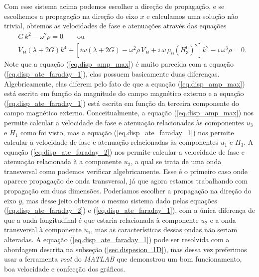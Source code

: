 Com esse sistema acima podemos escolher a dire\c{c}\~ao de propaga\c{c}\~ao, e se escolhemos a propaga\c{c}\~ao na dire\c{c}\~ao do eixo $x$ e calculamos uma solu\c{c}\~ao n\~ao trivial, obtemos as velocidades de fase e atenua\c{c}\~oes atrav\'es das equa\c{c}\~oes
\begin{align}\label{eq.disp_ate_faraday_2}
&G\,k^2-\omega^2\rho=0\qquad\text{ou}\\\label{eq.disp_ate_faraday_1}
&V_H(\lambda+2G)k^4+\left[i\omega(\lambda+2G)-\omega^2\rho\,V_H+i\,\omega\,\mu_0(H_3^0)^2\right]k^2-i\,\omega^3\rho=0.
\end{align}
Note que a equa\c{c}\~ao (\ref{eq.disp_amp_max}) \'e muito parecida com a equa\c{c}\~ao (\ref{eq.disp_ate_faraday_1}), elas possuem basicamente duas diferen\c{c}as. Algebricamente, elas diferem pelo fato de que a equa\c{c}\~ao (\ref{eq.disp_amp_max}) est\'a escrita em fun\c{c}\~ao da magnitude do campo magn\'etico externo e a equa\c{c}\~ao (\ref{eq.disp_ate_faraday_1}) est\'a escrita em fun\c{c}\~ao da terceira componente do campo magn\'etico externo. Conceitualmente, a equa\c{c}\~ao (\ref{eq.disp_amp_max}) nos permite calcular a velocidade de fase e atenua\c{c}\~ao relacionadas \`as componentes $u_{3}$ e $H_{1}$ como foi visto, mas a equa\c{c}\~ao (\ref{eq.disp_ate_faraday_1}) nos permite calcular a velocidade de fase e atenua\c{c}\~ao relacionadas \`as componentes $u_{1}$ e $H_{3}$. A equa\c{c}\~ao (\ref{eq.disp_ate_faraday_2}) nos permite calcular a velocidade de fase e atenua\c{c}\~ao relacionada \`a a componente $u_{2}$, a qual se trata de uma onda transversal como podemos verificar algebricamente. Esse \'e o primeiro caso onde aparece propaga\c{c}\~ao de onda transversal, j\'a que agora estamos trabalhando com propaga\c{c}\~ao em duas dimens\~oes. Poder\'iamos escolher a propaga\c{c}\~ao na dire\c{c}\~ao do eixo $y$, mas desse jeito obtemos o mesmo sistema dado pelas equa\c{c}\~oes (\ref{eq.disp_ate_faraday_2}) e (\ref{eq.disp_ate_faraday_1}), com a \'unica diferen\c{c}a de que a onda longitudinal \'e que estaria relacionada \`a componente $u_{2}$ e a onda transversal \`a componente $u_{1}$, mas as caracter\'isticas dessas ondas n\~ao seriam alteradas. A equa\c{c}\~ao (\ref{eq.disp_ate_faraday_1}) pode ser resolvida com a abordagem descrita na subse\c{c}\~ao (\ref{sec.dispesion_1D}), mas dessa vez preferimos usar a ferramenta \textit{root} do \textit{MATLAB} que demonstrou um bom funcionamento, boa velocidade e confec\c{c}\~ao dos gr\'aficos.

